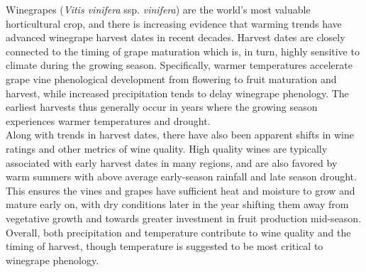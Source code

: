\documentclass[final]{nature}
\begin{document}
\noindent Winegrapes (\emph{Vitis vinifera} ssp. \emph{vinifera}) are the world's most valuable horticultural crop, and there is increasing evidence that warming trends have advanced winegrape harvest dates in recent decades\cite{Duchene:2005bd,Jones:2000br,schultzjones,Seguin2005,tomasi2011,odo2012,webb2012}. Harvest dates are closely connected to the timing of grape maturation which is, in turn, highly sensitive to climate during the growing season. Specifically, warmer temperatures accelerate grape vine phenological development from flowering to fruit maturation and harvest, while increased precipitation tends to delay winegrape phenology\cite{jones2013}. The earliest harvests thus generally occur in years where the growing season experiences warmer temperatures and drought\cite{Jones:2000br}.\\
\indent Along with trends in harvest dates, there have also been apparent shifts in wine ratings\cite{jones2005} and other metrics of wine quality\cite{Jones:2000br,mori2007}. High quality wines are typically associated with early harvest dates in many regions\cite{Jones:2000br,jones2005}, and are also favored by warm summers with above average early-season rainfall and late season drought. This ensures the vines and grapes have sufficient heat and moisture to grow and mature early on, with dry conditions later in the year shifting them away from vegetative growth and towards greater investment in fruit production mid-season\cite{chaves2010,jones2013,baciocco2014}. Overall, both precipitation\cite{vanlee2009} and temperature\cite{baciocco2014} contribute to wine quality and the timing of harvest\cite{odo2012,webb2012}, though temperature is suggested to be most critical to winegrape phenology\cite{coombe1987,jones2005}.\\
\end{document}
